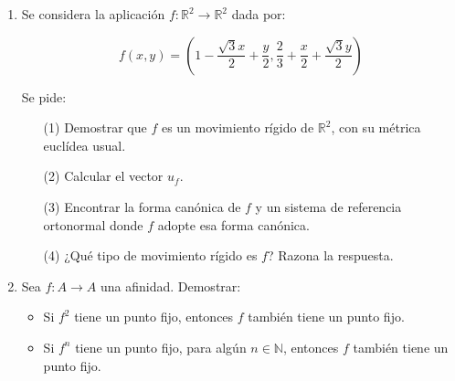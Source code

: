 \documentclass[fleqn]{article}
\begin{document}

\begin{enumerate}

	\item Se considera la aplicación $f : \mathbb{R}^2 \to \mathbb{R}^2$ dada por:

	      $$f(x, y) = (1 - \frac{\sqrt{3}x}{2} + \frac{y}{2}, \frac{2}{3} + \frac{x}{2} + \frac{\sqrt{3}y}{2})$$

	      Se pide:

	      \begin{enumerate}
		      \item[(1)] Demostrar que $f$ es un movimiento rígido de $\mathbb{R}^2$, con su métrica euclídea usual.
		      \item[(2)] Calcular el vector $u_f$.
		      \item[(3)] Encontrar la forma canónica de $f$ y un sistema de referencia ortonormal donde $f$ adopte esa forma canónica.
		      \item[(4)] ¿Qué tipo de movimiento rígido es $f$? Razona la respuesta.
	      \end{enumerate}

	\item Sea $f: A \to A$ una afinidad. Demostrar:

	      \begin{itemize}
		      \item Si $f^2$ tiene un punto fijo, entonces $f$ también tiene un punto fijo.
		      \item Si $f^n$ tiene un punto fijo, para algún $n \in \mathbb{N}$, entonces $f$ también tiene un punto fijo.
	      \end{itemize}

\end{enumerate}
\end{document}
